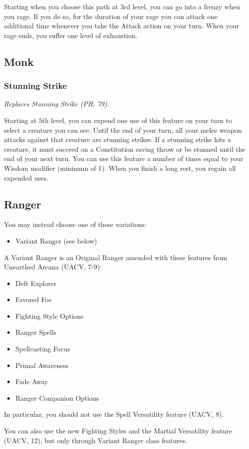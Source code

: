 \documentclass[House_Rules.tex]{subfiles}
\begin{document}
Starting when you choose this path at 3rd level, you can go into a frenzy when you rage. If you do so, for the duration of your rage you can attack one additional time whenever you take the Attack action on your turn. When your rage ends, you suffer one level of exhaustion.

\subsection{Monk}
\subsubsection{Stunning Strike}
\textit{Replaces Stunning Strike (PH, 79).}

Starting at 5th level, you can expend one use of this feature on your turn to select a creature you can see. Until the end of your turn, all your melee weapon attacks against that creature are stunning strikes. If a stunning strike hits a creature, it must succeed on a Constitution saving throw or be stunned until the end of your next turn. You can use this feature a number of times equal to your Wisdom modifier (minimum of 1). When you finish a long rest, you regain all expended uses.

\subsection{Ranger}
You may instead choose one of these variations:
\begin{itemize}
    \item Variant Ranger (see below)
\end{itemize}

A Variant Ranger is an Original Ranger amended with these features from Unearthed Arcana (UACV, 7-9):

\begin{itemize}
    \item Deft Explorer
    \item Favored Foe
    \item Fighting Style Options
    \item Ranger Spells
    \item Spellcasting Focus
    \item Primal Awareness
    \item Fade Away
    \item Ranger Companion Options
\end{itemize}

In particular, you should not use the Spell Versatility feature (UACV, 8).

You can also use the new Fighting Styles and the Martial Versatility feature (UACV, 12), but only through Variant Ranger class features.
\end{document}
